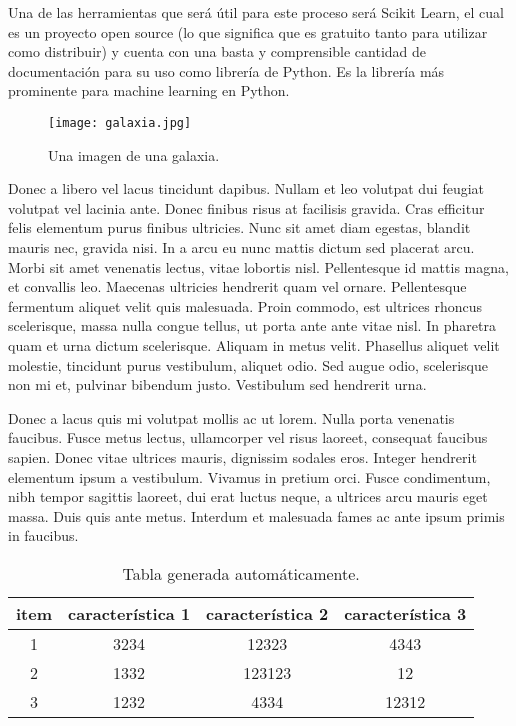 Una de las herramientas que será útil para este proceso será Scikit Learn, el cual es un proyecto open source (lo que significa que es gratuito tanto para utilizar como distribuir) y cuenta con una basta y comprensible cantidad de documentación para su uso como librería de Python. Es la librería más prominente para machine learning en Python.

\begin{figure}[t]
    \centering
    \texttt{[image: galaxia.jpg]}
    \caption{Una imagen de una galaxia.}
    \label{fig:mesh1}
\end{figure}

Donec a libero vel lacus tincidunt dapibus. Nullam et leo volutpat dui feugiat volutpat vel lacinia ante. Donec finibus risus at facilisis gravida. Cras efficitur felis elementum purus finibus ultricies. Nunc sit amet diam egestas, blandit mauris nec, gravida nisi. In a arcu eu nunc mattis dictum sed placerat arcu. Morbi sit amet venenatis lectus, vitae lobortis nisl. Pellentesque id mattis magna, et convallis leo. Maecenas ultricies hendrerit quam vel ornare. Pellentesque fermentum aliquet velit quis malesuada. Proin commodo, est ultrices rhoncus scelerisque, massa nulla congue tellus, ut porta ante ante vitae nisl. In pharetra quam et urna dictum scelerisque. Aliquam in metus velit. Phasellus aliquet velit molestie, tincidunt purus vestibulum, aliquet odio. Sed augue odio, scelerisque non mi et, pulvinar bibendum justo. Vestibulum sed hendrerit urna.

Donec a lacus quis mi volutpat mollis ac ut lorem. Nulla porta venenatis faucibus. Fusce metus lectus, ullamcorper vel risus laoreet, consequat faucibus sapien. Donec vitae ultrices mauris, dignissim sodales eros. Integer hendrerit elementum ipsum a vestibulum. Vivamus in pretium orci. Fusce condimentum, nibh tempor sagittis laoreet, dui erat luctus neque, a ultrices arcu mauris eget massa. Duis quis ante metus. Interdum et malesuada fames ac ante ipsum primis in faucibus.

\begin{table}[b]
\centering
\begin{tabular}{|c|c|c|c|}
\hline
\textbf{item} & \textbf{característica 1} & \textbf{característica 2} & \textbf{característica 3} \\ \hline
1             & 3234                      & 12323                     & 4343                      \\ \hline
2             & 1332                      & 123123                    & 12                        \\ \hline
3             & 1232                      & 4334                      & 12312                     \\ \hline
\end{tabular}
\caption{Tabla generada automáticamente.}
    \label{cuadro:prueba2}
\end{table}

